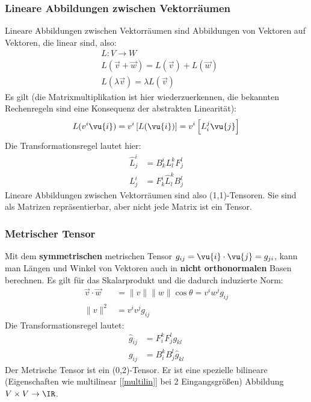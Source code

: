 	\subsubsection{Lineare Abbildungen zwischen Vektorräumen}
	Lineare Abbildungen zwischen Vektorräumen sind Abbildungen von Vektoren auf Vektoren, die linear sind, also:
	\begin{equation}\begin{split}
			&L:V\to W\\
			&L(\vec{v}+\vec{w}) = L(\vec{v})+L(\vec{w})\\
			&L(\lambda\vec{v}) = \lambda L(\vec{v})
	\end{split}\end{equation}
	Es gilt (die Matrixmultiplikation ist hier wiederzuerkennen, die bekannten Rechenregeln sind eine Konsequenz der abstrakten Linearität):
	\begin{equation}\label{linearabb}\begin{split}
			L(v^i\vu{i}) = v^i \left[L(\vu{i})\right]=v^i \left[L^j_i\vu{j}\right]
	\end{split}\end{equation}
	Die Transformationsregel lautet hier:
	\begin{equation}\label{translin}\begin{split}
			\hat{L}^i_j&=B^i_k L^k_l F^l_j\\
			L^i_j&=F^i_k \hat{L}^k_l B^l_j
	\end{split}\end{equation}
	Lineare Abbildungen zwischen Vektorräumen sind also (1,1)-Tensoren. Sie sind als Matrizen repräsentierbar, aber nicht jede Matrix ist ein Tensor.
	\subsubsection{Metrischer Tensor}
	Mit dem \textbf{symmetrischen} metrischen Tensor $g_{ij}=\vu{i}\cdot\vu{j}=g_{ji}$, kann man Längen und Winkel von Vektoren auch in \textbf{nicht orthonormalen} Basen berechnen. Es gilt für das Skalarprodukt und die dadurch induzierte Norm:
	\begin{equation} \begin{split}
			\vec{v}\cdot\vec{w}&=\lVert v\rVert\lVert w\rVert \cos \theta=v^i w^j g_{ij}\\
			\lVert v\rVert^2&=v^i v^j g_{ij}
	\end{split}\end{equation}
	Die Transformationsregel lautet:
	\begin{equation}\begin{split}
			\hat{g}_{ij}&=F^k_i F^l_j g_{kl}\\
			g_{ij}&=B^k_i B^l_j \hat{g}_{kl}
	\end{split}\end{equation}
	Der Metrische Tensor ist ein (0,2)-Tensor. Er ist eine spezielle bilineare (Eigenschaften wie multilinear [\ref{multilin}] bei 2 Eingangsgrößen) Abbildung $V\times V \to  \IR$.
